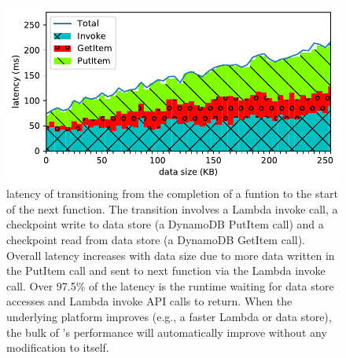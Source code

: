 

\begin{figure}[t!]
    \centering
    \includegraphics[width=\columnwidth]{figures/TotalAdditionalLatencyNBreakdown.pdf}
    \caption{\name{} latency of transitioning from the completion of a funtion
    to the start of the next function. The transition involves a Lambda
    invoke call, a checkpoint write to data store (a DynamoDB PutItem call)
    and a checkpoint read from data store (a DynamoDB GetItem call). Overall
    latency increases with data size due to more data written in the PutItem
    call and sent to next function via the Lambda invoke call. Over 97.5\% of
    the latency is the
    \name{} runtime waiting for data store accesses and Lambda invoke API
    calls to return. When the underlying platform improves (e.g., a faster
    Lambda or data store), the bulk of \name{}'s performance will
    automatically improve without any modification to \name{} itself.}
    \label{fig:totallatency}
\end{figure}



